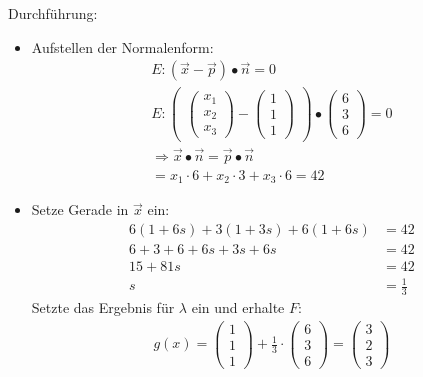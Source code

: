 Durchführung: 
\begin{itemize}

    \item Aufstellen der Normalenform: 
\[
\begin{gathered}
    E: (\vec{x} - \vec{p}) \bullet \vec{n} = 0 \\
    E: 
    \begin{pmatrix}
        \begin{pmatrix}
            x_1 \\ x_2 \\ x_3
        \end{pmatrix}
        - 
        \begin{pmatrix}
            1 \\ 1 \\ 1
        \end{pmatrix}
    \end{pmatrix}
    \bullet
    \begin{pmatrix}
        6 \\ 3 \\ 6
    \end{pmatrix}
    = 0 \\
    \Rightarrow
    \vec{x} \bullet \vec{n} = \vec{p} \bullet \vec{n} \\
    = x_1\cdot 6 + x_2 \cdot 3 + x_3 \cdot 6 = 42
\end{gathered}
\]
    \item Setze Gerade in $\vec{x}$ ein: 
\[
    \begin{aligned}
        6(1+6s) + 3(1+3s) + 6(1+6s) &= 42  \\
        6 + 3 + 6 + 6s + 3s + 6s &= 42 \\
        15 + 81s &= 42 \\
        s &= \frac{1}{3}
    \end{aligned}
\]
Setzte das Ergebnis für $\lambda$ ein und erhalte $F$: 
\[
    \begin{gathered}
g(x) = 
\begin{pmatrix}
    1 \\ 1 \\ 1
\end{pmatrix}
+ \frac{1}{3} \cdot
\begin{pmatrix}
    6 \\ 3 \\ 6
\end{pmatrix}
= 
\begin{pmatrix}
    3 \\ 2 \\ 3
\end{pmatrix}
\end{gathered}
\]


\end{itemize}
